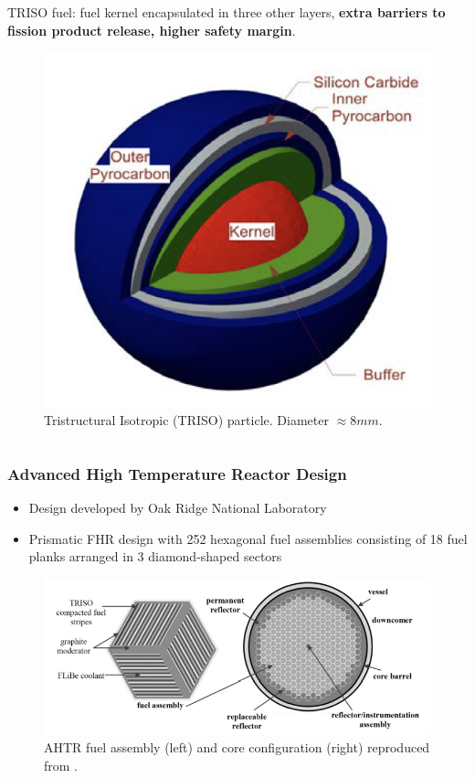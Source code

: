 \begin{frame}
\begin{columns}
\begin{column}{0.5\textwidth}
            \vspace{0.2cm}
            \acrfull{TRISO} fuel: fuel kernel encapsulated in three other layers, 
            \textbf{extra barriers to fission product release, higher safety margin}. 
            \vspace{-0.1cm}
            \begin{figure}[htbp!]
                \includegraphics[width=0.45\linewidth]{../docs/figures/ahtr-triso.png}
                \caption{Tristructural Isotropic (TRISO) 
                particle. Diameter $\approx 8mm$.}
            \end{figure}
        \end{column}
    \end{columns}
        \end{frame}

    \begin{frame}
    \frametitle{Advanced High Temperature Reactor Design}
        \begin{itemize}
        \item Design developed by Oak Ridge National Laboratory
        \item Prismatic FHR design with 252 hexagonal fuel assemblies consisting of 
        18 fuel planks arranged in 3 diamond-shaped sectors
        \end{itemize}
    
    \vspace{0.2cm}
    \begin{figure}[]
        \centering
        \includegraphics[width=\linewidth]{../docs/figures/ahtr.png} 
        \caption{\acrlong{AHTR} fuel assembly (left) and core configuration (right) 
        reproduced from \cite{ramey_monte_2018}.}
        \label{fig:ahtr}
    \end{figure}
    \end{frame}

